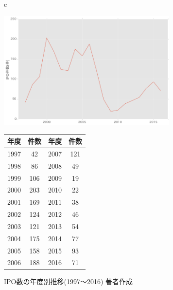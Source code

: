 \documentclass{jsarticle}
\begin{document}
\begin{figure}[p]
  \begin{center}
  \caption{IPO数の年度別推移(1997〜2016) 著者作成}
  \begin{tabular}{c}
  \begin{minipage}{0.5\hsize}
  \begin{center}
    \includegraphics[clip,width=9cm]{./year_count.png}
     \end{center}
\end{minipage}
\begin{minipage}{0.5\hsize}
\begin{center}
    \label{fig:year}
\begin{tabular}{cc|cc}
		\hline
		年度 & 件数 & 年度 & 件数 \\
		\hline \hline
1997  &   42 & 2007  &  121\\
1998  &   86 & 2008   &  49\\
1999   & 106 & 2009  &   19\\
2000 &   203 & 2010  &   22\\
2001  &  169 & 2011   &  38\\
2002 &   124 & 2012  &   46\\
2003 &   121 & 2013 &    54\\
2004 &   175 & 2014   &  77\\
2005 &   158 & 2015  &   93\\
2006  &  188 & 2016 &    71\\
		\hline
	\end{tabular} 
	 \end{center}
	\end{minipage}
	  \end{tabular}
	    \end{center}
\end{figure}
\end{document}
